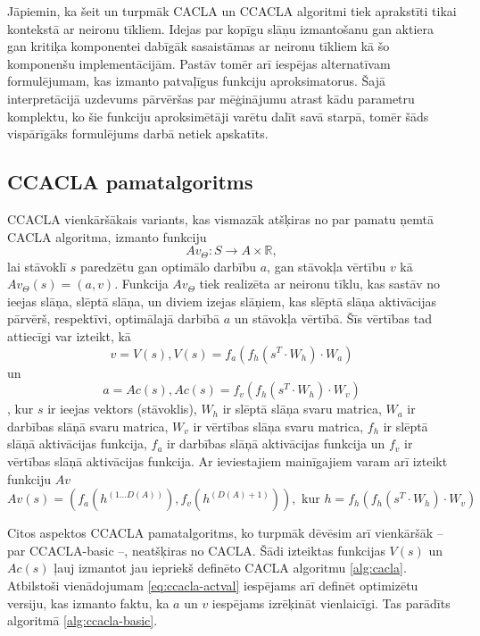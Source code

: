 \documentclass{ludis} %
\begin{document}
Jāpiemin, ka šeit un turpmāk CACLA un CCACLA algoritmi tiek aprakstīti tikai
kontekstā ar neironu tīkliem. Idejas par kopīgu slāņu izmantošanu gan aktiera
gan kritiķa komponentei dabīgāk sasaistāmas ar neironu tīkliem kā šo komponenšu
implementācijām. Pastāv tomēr arī iespējas alternatīvam formulējumam, kas
izmanto patvaļīgus funkciju aproksimatorus. Šajā interpretācijā uzdevums
pārvēršas par mēģinājumu atrast kādu parametru komplektu, ko šie funkciju
aproksimētāji varētu dalīt savā starpā, tomēr šāds vispārīgāks formulējums darbā
netiek apskatīts.

\subsection{CCACLA pamatalgoritms}
CCACLA vienkāršākais variants, kas vismazāk atšķiras no par pamatu ņemtā CACLA
algoritma, izmanto funkciju 
\begin{equation}
  Av_\Theta:S \rightarrow A \times \mathbb{R},
\end{equation}
lai stāvoklī $s$ paredzētu gan optimālo darbību $a$, gan stāvokļa vērtību $v$ kā
$Av_\Theta(s) = (a, v)$. Funkcija $Av_\Theta$ tiek realizēta ar
neironu tīklu, kas sastāv no ieejas slāņa, slēptā slāņa, un diviem izejas
slāņiem, kas slēptā slāņa aktivācijas pārvērš, respektīvi, optimālajā darbībā
$a$ un stāvokļa vērtībā. Šīs vērtības tad attiecīgi var izteikt, kā
\begin{equation}\label{eq:ccacla-act}
  v = V(s), V(s) = f_a\left(f_h(s^T \cdot W_h) \cdot W_a\right)
\end{equation} un
\begin{equation}\label{eq:ccacla-val}
  a = Ac(s), Ac(s) = f_v\left(f_h(s^T \cdot W_h) \cdot W_v\right)
\end{equation}, kur $s$ ir
ieejas vektors (stāvoklis), $W_h$ ir slēptā slāņa svaru matrica, $W_a$ ir
darbības slāņā svaru matrica, $W_v$ ir vērtības slāņa svaru matrica, $f_h$ ir
slēptā slāņā aktivācijas funkcija, $f_a$ ir darbības slāņā aktivācijas funkcija
un $f_v$ ir vērtības slāņā aktivācijas funkcija. Ar ieviestajiem mainīgajiem
varam arī izteikt funkciju $Av$
\begin{equation}\label{eq:ccacla-actval}
  Av(s) = \left(f_a(h^{(1 \ldots D(A))}), f_v(h^{(D(A) + 1)})\right), \text{ kur } 
  h = f_h\left(f_h(s^T \cdot W_h) \cdot W_v\right)
\end{equation}

Citos aspektos CCACLA pamatalgoritms, ko turpmāk dēvēsim arī vienkāršāk -- par
CCACLA-basic --, neatšķiras no CACLA. Šādi izteiktas funkcijas
$V(s)$ un $Ac(s)$ ļauj izmantot jau iepriekš definēto CACLA algoritmu
\ref{alg:cacla}. Atbilstoši vienādojumam \ref{eq:ccacla-actval} iespējams
arī definēt optimizētu versiju, kas izmanto faktu, ka $a$ un $v$ iespējams
izrēķināt vienlaicīgi. Tas parādīts algoritmā \ref{alg:ccacla-basic}.
\end{document}
